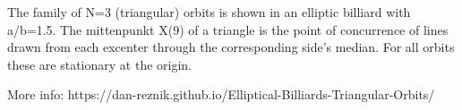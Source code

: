 The family of N=3 (triangular) orbits is shown in an elliptic billiard with a/b=1.5. The mittenpunkt X(9) of a triangle is the point of concurrence of lines drawn from each excenter through the corresponding side's median. For all orbits these are stationary at the origin.

More info: https://dan-reznik.github.io/Elliptical-Billiards-Triangular-Orbits/